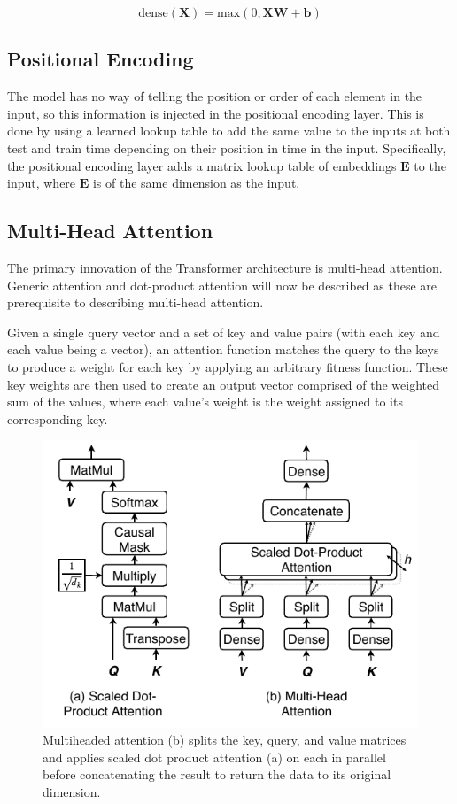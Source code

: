 \begin{equation} \label{dense_layer}
\text{dense}(\boldsymbol{X}) = \text{max}(0, \boldsymbol{XW} + \boldsymbol{b})
\end{equation}

\subsection{Positional Encoding}
The model has no way of telling the position or order of each element in the input, so this information is injected in the positional encoding layer.
This is done by using a learned lookup table to add the same value to the inputs at both test and train time depending on their position in time in the input.
Specifically, the positional encoding layer adds a matrix lookup table of embeddings $\boldsymbol{E}$ to the input, where $\boldsymbol{E}$ is of the same dimension as the input.

\subsection{Multi-Head Attention} \label{multihead_attention}
The primary innovation of the Transformer architecture is multi-head attention.
Generic attention and dot-product attention will now be described as these are prerequisite to describing multi-head attention.

Given a single query vector and a set of key and value pairs (with each key and each value being a vector), an attention function matches the query to the keys to produce a weight for each key by applying an arbitrary fitness function.
These key weights are then used to create an output vector comprised of the weighted sum of the values, where each value's weight is the weight assigned to its corresponding key. 

\begin{figure}[htbp]
	\centerline{\includegraphics[width=.35\textwidth]{images/multihead_attn.pdf}}
	\caption{Multiheaded attention (b) splits the key, query, and value matrices and applies scaled dot product attention (a) on each in parallel before concatenating the result to return the data to its original dimension.}
	\label{fig:multihead}
\end{figure}

